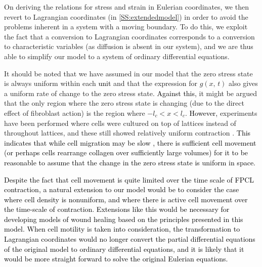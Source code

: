 On deriving the relations for stress and strain in Eulerian coordinates, we then revert to Lagrangian coordinates (in \ref{SS:extendedmodel}) in order to avoid the problems inherent in a system with a moving boundary. To do this, we exploit the fact that a conversion to Lagrangian coordinates corresponds to a conversion to characteristic variables (as diffusion is absent in our system), and we are thus able to simplify our model to a system of ordinary differential equations.

It should be noted that we have assumed in our model that the zero stress state is always uniform within each \textcolor{black}{unit} and that the expression for $g(x,\,t)$ also gives a uniform rate of change to the zero stress state.
\textcolor{black}{Against this,} it might be argued that the only region where the zero stress state is changing (due to the direct effect of fibroblast action) is the region where $-l_c < x < l_c$.
\textcolor{black}{However,} experiments have been performed where cells were cultured on top of lattices instead of throughout lattices, and these still showed relatively uniform contraction \citep{Grinnell1984,Guidry1985,Guidry1986}. \textcolor{black}{This indicates that while cell migration may be slow \citep{Grinnell1984,Ascione2016}, there is sufficient cell movement (or perhaps cells rearrange collagen over sufficiently large volumes) for it to be reasonable to assume that the change in the zero stress state is uniform in space.}

\textcolor{black}{Despite the fact that cell movement is quite limited over the time scale of FPCL contraction, a natural extension to our model would be to consider the case where cell density is nonuniform, and where there is active cell movement over the time-scale of contraction. Extensions like this would be necessary for developing models of wound healing based on the principles presented in this model. When cell motility is taken into consideration, the transformation to Lagrangian coordinates would no longer convert the partial differential equations of the original model to ordinary differential equations, and it is likely that it would be more straight forward to solve the original Eulerian equations.}


